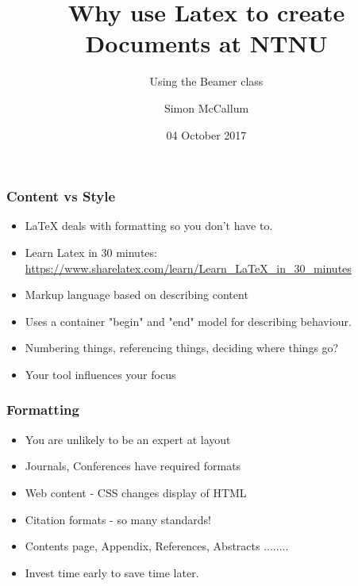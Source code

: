 \documentclass[screen, aspectratio=43]{beamer}
\title[Latex Document]{Why use Latex to create \\Documents at NTNU}
\subtitle{Using the Beamer class}
\author[S. McCallum]{Simon McCallum}
\institute[NTNU]{Department of Computer Sciences, NTNU}
\date{04 October 2017}
\begin{document}
\begin{frame}
  \titlepage
\end{frame}


\begin{frame}
  \frametitle{Content vs Style}
  \begin{itemize}
      \item {\LaTeX} deals with formatting so you don't have to.
      \item Learn Latex in 30 minutes: \url{https://www.sharelatex.com/learn/Learn_LaTeX_in_30_minutes}
      \item Markup language based on describing content
      \item Uses a container "begin" and "end" model for describing behaviour.
      \item Numbering things, referencing things, deciding where things go?
      \item Your tool influences your focus
  \end{itemize}
\end{frame}

\begin{frame}
  \frametitle{Formatting}
  \begin{itemize}
      \item You are unlikely to be an expert at layout
      \item Journals, Conferences have required formats
      \item Web content - CSS changes display of HTML
      \item Citation formats - so many standards!
      \item Contents page, Appendix, References, Abstracts ........
      \item Invest time early to save time later.
     
  \end{itemize}

\end{frame}
\end{document}
